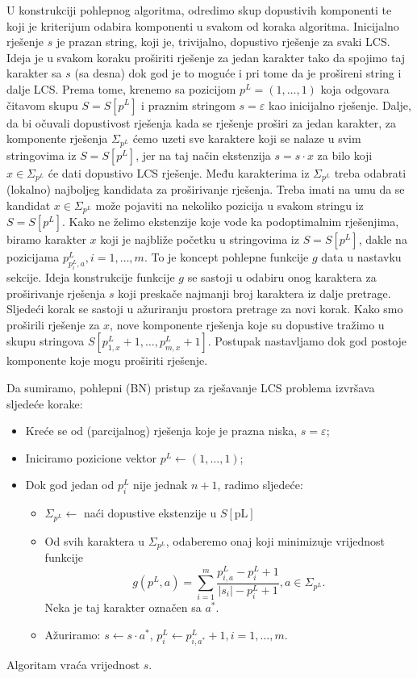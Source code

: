 \documentclass[a4paper, utf8, 11pt, colorlinks]{book}
\begin{document}
U konstrukciji pohlepnog algoritma, odredimo  skup dopustivih komponenti te koji je kriterijum odabira komponenti u svakom od koraka algoritma. Inicijalno rješenje $s$ je prazan string, koji je, trivijalno, dopustivo rješenje za svaki LCS. Ideja je u svakom koraku proširiti rješenje za jedan karakter tako da spojimo taj karakter sa $s$ (sa desna) dok god je to moguće i pri tome da je prošireni string i dalje LCS. Prema tome, krenemo sa pozicijom $p^L = (1, \ldots, 1)$ koja odgovara čitavom skupu $S=S[p^L]$ i praznim stringom $s =\varepsilon$ kao inicijalno rješenje. Dalje, da bi očuvali dopustivost rješenja kada se rješenje proširi za jedan karakter, za komponente rješenja $\Sigma_{p^L}$ ćemo uzeti sve karaktere koji se nalaze u svim stringovima iz $S=S[p^L]$, jer na taj način  ekstenzija $s = s \cdot x$ za bilo koji $x \in \Sigma_{p^L}$ će dati dopustivo LCS rješenje. Među karakterima iz $\Sigma_{p^L}$ treba odabrati (lokalno) najboljeg kandidata za proširivanje rješenja. Treba imati na umu da se kandidat $x\in \Sigma_{p^L}$ može pojaviti na nekoliko pozicija u svakom stringu iz $S=S[p^L]$. Kako ne želimo ekstenzije koje vode ka podoptimalnim rješenjima, biramo karakter $x$ koji je najbliže početku u stringovima iz $S=S[p^L]$, dakle na pozicijama $p^L_{p^L_{i},a},i=1,\ldots,m$. 
To je koncept pohlepne funkcije $g$ data u nastavku sekcije. Ideja konstrukcije funkcije $g$ se sastoji u odabiru onog karaktera za proširivanje rješenja $s$ koji preskače najmanji broj karaktera iz dalje pretrage. Sljedeći korak se sastoji u ažuriranju prostora pretrage za novi korak. Kako smo proširili rješenje za $x$, nove komponente rješenja koje su dopustive tražimo u skupu stringova $S[p^L_{1,x}+1,\ldots, p^L_{m, x}+1]$. Postupak nastavljamo dok god postoje komponente koje mogu proširiti rješenje. 


\noindent Da sumiramo, pohlepni (BN) pristup za rješavanje LCS problema izvršava sljedeće korake:
\begin{itemize}
	\item Kreće se od (parcijalnog) rješenja koje je prazna niska, $s=\varepsilon$;
	\item Iniciramo pozicione vektor $p^L \gets (1,\ldots, 1) $;
	\item Dok god jedan od $p^L_i$ nije jednak $n+1$, radimo sljedeće: 
	\begin{itemize}
   	     \item $\Sigma_{p^L} \gets$ naći dopustive ekstenzije u $S[\textrm{pL}]$
	      \item Od svih karaktera u $\Sigma_{p^L}$, odaberemo onaj koji minimizuje vrijednost funkcije 
	      $$g( p^L,a) = \sum_{i=1}^m\frac{p^L_{i,a} - p^L_i + 1 }{|s_i| - p^L_i + 1 }, a \in \Sigma_{ p^L }.$$
	      Neka je taj karakter označen sa $a^*$. 
	      \item Ažuriramo: $s \gets  s \cdot a^*$, $p^L_i \gets p^L_{i, a^*} +1, i = 1,\ldots,m.$
    \end{itemize}
\end{itemize}
Algoritam vraća vrijednost $s$. 
\end{document}
